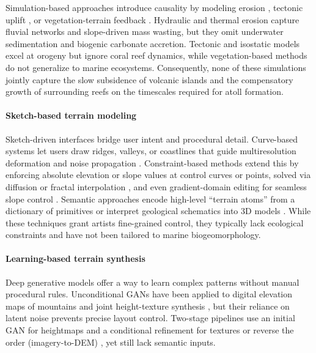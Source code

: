 \documentclass{egpubl}
\begin{document}
Simulation-based approaches introduce causality by modeling erosion \cite{Benes2006,Neidhold2005,Mei2007}, tectonic uplift \cite{Cordonnier2016,Cordonnier2017a,Schott2023}, or vegetation-terrain feedback \cite{Ecormier-Nocca2021,Cordonnier2017b}. Hydraulic and thermal erosion capture fluvial networks and slope-driven mass wasting, but they omit underwater sedimentation and biogenic carbonate accretion. Tectonic and isostatic models excel at orogeny but ignore coral reef dynamics, while vegetation-based methods do not generalize to marine ecosystems. Consequently, none of these simulations jointly capture the slow subsidence of volcanic islands and the compensatory growth of surrounding reefs on the timescales required for atoll formation.

\paragraph{Sketch-based terrain modeling}
Sketch-driven interfaces bridge user intent and procedural detail. Curve-based systems let users draw ridges, valleys, or coastlines that guide multiresolution deformation and noise propagation \cite{Gain2009,Hnaidi2010}. Constraint-based methods extend this by enforcing absolute elevation or slope values at control curves or points, solved via diffusion or fractal interpolation \cite{Gasch2020,Talgorn2018}, and even gradient-domain editing for seamless slope control \cite{Guerin2022}. Semantic approaches encode high-level “terrain atoms” from a dictionary of primitives \cite{Genevaux2015} or interpret geological schematics into 3D models \cite{Natali2012}. While these techniques grant artists fine-grained control, they typically lack ecological constraints and have not been tailored to marine biogeomorphology.

\paragraph{Learning-based terrain synthesis}
Deep generative models offer a way to learn complex patterns without manual procedural rules. Unconditional GANs have been applied to digital elevation maps of mountains \cite{WulffJensen2018} and joint height-texture synthesis \cite{Spick2019}, but their reliance on latent noise prevents precise layout control. Two-stage pipelines use an initial GAN for heightmaps and a conditional refinement for textures \cite{Beckham2017} or reverse the order (imagery-to-DEM) \cite{Panagiotou2020}, yet still lack semantic inputs.
\end{document}
